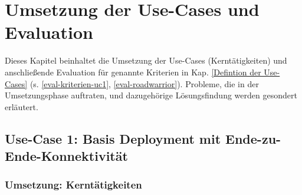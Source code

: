 \chapter{Umsetzung der Use-Cases und Evaluation} \label{Umsetzung der Use-Cases und Evaluation}
Dieses Kapitel beinhaltet die Umsetzung der Use-Cases (\glqq Kerntätigkeiten\grqq{}) und anschließende Evaluation für genannte Kriterien in Kap. \ref{Defintion der Use-Cases} (s. \ref{eval-kriterien-uc1}, \ref{eval-roadwarrior}). Probleme, die in der Umsetzungsphase auftraten, und dazugehörige Lösungsfindung werden gesondert erläutert.

\section{Use-Case 1: Basis Deployment mit Ende-zu-Ende-Konnektivität} \label{Use-Case 1: Basis Deployment}
\subsection{Umsetzung: Kerntätigkeiten}

